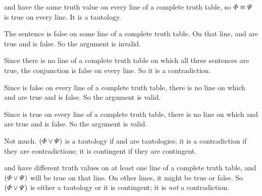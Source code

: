 \begin{earg}
\item %
\metaA{} and \metaB{} have the same truth value on every line of a complete truth table, so $\varPhi{}\equiv\varPsi{}$ is true on every line. It is a tautology.
\item %
The sentence is false on some line of a complete truth table. On that line, \metaA{} and \metaB{} are true and \metaC{} is false. So the argument is invalid.
\item %
Since there is no line of a complete truth table on which all three sentences are true, the conjunction is false on every line. So it is a contradiction.
\item %
Since \metaA{} is false on every line of a complete truth table, there is no line on which \metaA{} and \metaB{} are true and \metaC{} is false. So the argument is valid.
\item %
Since \metaC{} is true on every line of a complete truth table, there is no line on which \metaA{} and \metaB{} are true and \metaC{} is false. So the argument is valid.
\item %
Not much. $(\varPhi{}\vee\varPsi{})$ is a tautology if \metaA{} and \metaB{} are tautologies; it is a contradiction if they are contradictions; it is contingent if they are contingent.
\item %
\metaA{} and \metaB{} have different truth values on at least one line of a complete truth table, and $(\varPhi{}\vee\varPsi{})$ will be true on that line. On other lines, it might be true or false. So $(\varPhi{}\vee\varPsi{})$ is either a tautology or it is contingent; it is \emph{not} a contradiction.
\end{earg}

